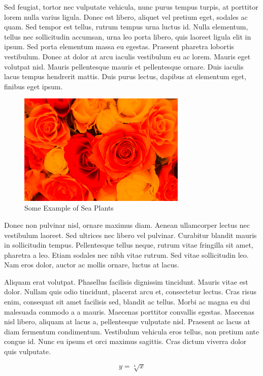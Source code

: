 \documentclass[a4paper, 12pt]{article}
\begin{document}
	Sed feugiat, tortor nec vulputate vehicula, nunc purus tempus turpis, at porttitor lorem nulla varius ligula. Donec est libero, aliquet vel pretium eget, sodales ac quam. Sed tempor est tellus, rutrum tempus urna luctus id. Nulla elementum, tellus nec sollicitudin accumsan, urna leo porta libero, quis laoreet ligula elit in ipsum. Sed porta elementum massa eu egestas. Praesent pharetra lobortis vestibulum. Donec at dolor at arcu iaculis vestibulum eu ac lorem. Mauris eget volutpat nisl. Mauris pellentesque mauris et pellentesque ornare. Duis iaculis lacus tempus hendrerit mattis. Duis purus lectus, dapibus at elementum eget, finibus eget ipsum.	
	\begin{figure}[h!]
		\centering
		\includegraphics[width=8cm]{images/f1.jpg}
		\caption{Some Example of Sea Plants}
		\label{fig:f1}
	\end{figure}
	
	Donec non pulvinar nisl, ornare maximus diam. Aenean ullamcorper lectus nec vestibulum laoreet. Sed ultrices nec libero vel pulvinar. Curabitur blandit mauris in sollicitudin tempus. Pellentesque tellus neque, rutrum vitae fringilla sit amet, pharetra a leo. Etiam sodales nec nibh vitae rutrum. Sed vitae sollicitudin leo. Nam eros dolor, auctor ac mollis ornare, luctus at lacus.
	
	Aliquam erat volutpat. Phasellus facilisis dignissim tincidunt. Mauris vitae est dolor. Nullam quis odio tincidunt, placerat arcu et, consectetur lectus. Cras risus enim, consequat sit amet facilisis sed, blandit ac tellus. Morbi ac magna eu dui malesuada commodo a a mauris. Maecenas porttitor convallis egestas. Maecenas nisl libero, aliquam at lacus a, pellentesque vulputate nisl. Praesent ac lacus at diam fermentum condimentum. Vestibulum vehicula eros tellus, non pretium ante congue id. Nunc eu ipsum et orci maximus sagittis. Cras dictum viverra dolor quis vulputate.
	
	\begin{equation}
		y = \sqrt[4]{x}
	\end{equation}
	
\end{document}
